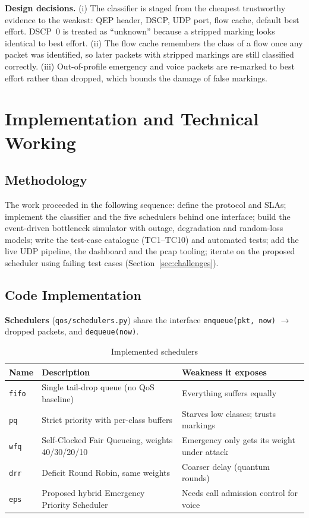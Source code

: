 \documentclass[12pt,a4paper]{article}
\newcommand{\code}[1]{\texttt{#1}}
\begin{document}
\textbf{Design decisions.} (i) The classifier is staged from the cheapest trustworthy evidence to
the weakest: QEP header, DSCP, UDP port, flow cache, default best effort. DSCP~0 is treated as
``unknown'' because a stripped marking looks identical to best effort. (ii) The flow cache remembers
the class of a flow once any packet was identified, so later packets with stripped markings are
still classified correctly. (iii) Out-of-profile emergency and voice packets are re-marked to best
effort rather than dropped, which bounds the damage of false markings.

\section{Implementation and Technical Working}

\subsection{Methodology}
The work proceeded in the following sequence: define the protocol and SLAs; implement the
classifier and the five schedulers behind one interface; build the event-driven bottleneck
simulator with outage, degradation and random-loss models; write the test-case catalogue
(TC1--TC10) and automated tests; add the live UDP pipeline, the dashboard and the pcap tooling;
iterate on the proposed scheduler using failing test cases (Section~\ref{sec:challenges}).

\subsection{Code Implementation}
\textbf{Schedulers} (\code{qos/schedulers.py}) share the interface
\code{enqueue(pkt, now)} $\rightarrow$ dropped packets, and \code{dequeue(now)}.

\begin{table}[H]\centering\small
\caption{Implemented schedulers}\label{tab:sched}
\begin{tabularx}{\textwidth}{|l|X|X|}\hline
\textbf{Name} & \textbf{Description} & \textbf{Weakness it exposes}\\\hline
\code{fifo} & Single tail-drop queue (no QoS baseline) & Everything suffers equally\\\hline
\code{pq} & Strict priority with per-class buffers & Starves low classes; trusts markings\\\hline
\code{wfq} & Self-Clocked Fair Queueing, weights 40/30/20/10 & Emergency only gets its weight under attack\\\hline
\code{drr} & Deficit Round Robin, same weights & Coarser delay (quantum rounds)\\\hline
\code{eps} & Proposed hybrid Emergency Priority Scheduler & Needs call admission control for voice\\\hline
\end{tabularx}
\end{table}
\end{document}
